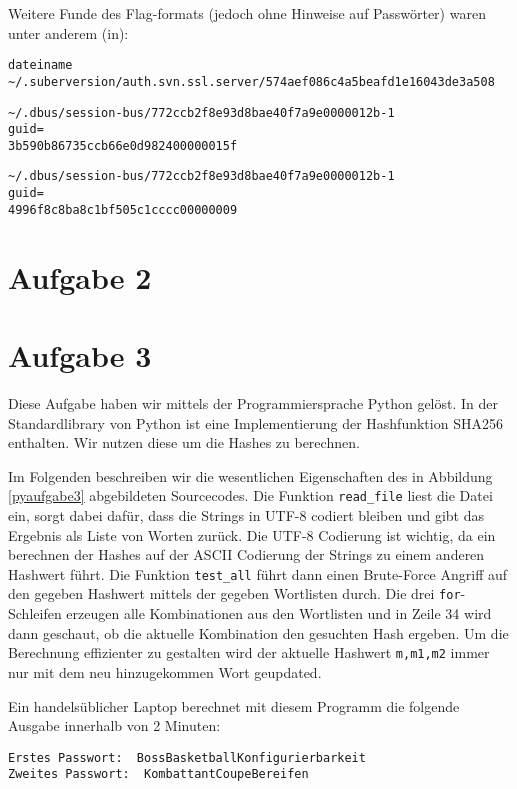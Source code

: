 \documentclass[10pt,a4paper]{article}
\newcommand\pythonstyle{\lstset{
language=Python,
basicstyle=\ttm,
otherkeywords={self},             %
keywordstyle=\ttb\color{deepblue},
emph={MyClass,__init__},          %
emphstyle=\ttb\color{deepred},    %
stringstyle=\color{deepgreen},
frame=tb,                         %
showstringspaces=false,           %
numbers=left
}}
\newcommand\pythonexternal[1]{{
\pythonstyle
}}
\begin{document}
Weitere Funde des Flag-formats (jedoch ohne Hinweise auf Passwörter) waren unter anderem (in):
\begin{verbatim}
dateiname
~/.suberversion/auth.svn.ssl.server/574aef086c4a5beafd1e16043de3a508
\end{verbatim}

\begin{verbatim}
~/.dbus/session-bus/772ccb2f8e93d8bae40f7a9e0000012b-1
guid=
3b590b86735ccb66e0d982400000015f
\end{verbatim}

\begin{verbatim}
~/.dbus/session-bus/772ccb2f8e93d8bae40f7a9e0000012b-1
guid=
4996f8c8ba8c1bf505c1cccc00000009
\end{verbatim}

\section*{Aufgabe 2}

\section*{Aufgabe 3}

Diese Aufgabe haben wir mittels der Programmiersprache Python gelöst. In der Standardlibrary von Python ist eine Implementierung der Hashfunktion SHA256 enthalten. Wir nutzen diese um die Hashes zu berechnen. 

Im Folgenden beschreiben wir die wesentlichen Eigenschaften des in Abbildung \ref{pyaufgabe3} abgebildeten Sourcecodes. Die Funktion \texttt{read\_file} liest die Datei ein, sorgt dabei dafür, dass die Strings in UTF-8 codiert bleiben und gibt das Ergebnis als Liste von Worten zurück. Die UTF-8 Codierung ist wichtig, da ein berechnen der Hashes auf der ASCII Codierung der Strings zu einem anderen Hashwert führt. Die Funktion \texttt{test\_all} führt dann einen Brute-Force Angriff auf den gegeben Hashwert mittels der gegeben Wortlisten durch. Die drei \texttt{for}-Schleifen erzeugen alle Kombinationen aus den Wortlisten und in Zeile 34 wird dann geschaut, ob die aktuelle Kombination den gesuchten Hash ergeben. Um die Berechnung effizienter zu gestalten wird der aktuelle Hashwert \texttt{m,m1,m2} immer nur mit dem neu hinzugekommen Wort geupdated. 

Ein handelsüblicher Laptop berechnet mit diesem Programm die folgende Ausgabe innerhalb von 2 Minuten:
\begin{verbatim}
Erstes Passwort:  BossBasketballKonfigurierbarkeit
Zweites Passwort:  KombattantCoupeBereifen
\end{verbatim} 

\end{document}
